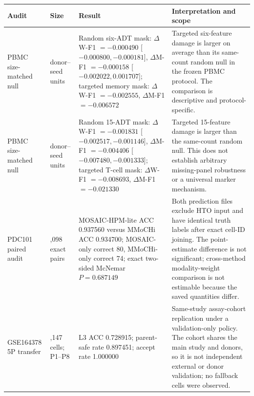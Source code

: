 \begin{tabularx}{\textwidth}{>{\raggedright\arraybackslash}p{2.7cm} >{\raggedright\arraybackslash}p{2.1cm} >{\raggedright\arraybackslash}p{4.2cm} X}
\toprule
Audit & Size & Result & Interpretation and scope \\
\midrule
PBMC size-matched null & 24 donor--seed units & Random six-ADT mask: $\Delta$W-F1 $=-0.000490$ [$-0.000800,-0.000181$], $\Delta$M-F1 $=-0.000158$ [$-0.002022,0.001707$]; targeted memory mask: $\Delta$W-F1 $=-0.002555$, $\Delta$M-F1 $=-0.006572$ & Targeted six-feature damage is larger on average than its same-count random null in the frozen PBMC protocol. The comparison is descriptive and protocol-specific. \\
PBMC size-matched null & 24 donor--seed units & Random 15-ADT mask: $\Delta$W-F1 $=-0.001831$ [$-0.002517,-0.001146$], $\Delta$M-F1 $=-0.004406$ [$-0.007480,-0.001333$]; targeted T-cell mask: $\Delta$W-F1 $=-0.008693$, $\Delta$M-F1 $=-0.021330$ & Targeted 15-feature damage is larger than the same-count random null. This does not establish arbitrary missing-panel robustness or a universal marker mechanism. \\
PDC101 paired audit & 2,098 exact pairs & MOSAIC-HPM-lite ACC 0.937560 versus MMoCHi ACC 0.934700; MOSAIC-only correct 80, MMoCHi-only correct 74; exact two-sided McNemar $P=0.687149$ & Both prediction files exclude HTO input and have identical truth labels after exact cell-ID joining. The point-estimate difference is not significant; cross-method modality-weight comparison is not estimable because the saved quantities differ. \\
GSE164378 5P transfer & 49,147 cells; P1--P8 & L3 ACC 0.728915; parent-safe rate 0.897451; accept rate 1.000000 & Same-study assay-cohort replication under a validation-only policy. The cohort shares the main study and donors, so it is not independent external or donor validation; no fallback cells were observed. \\
\bottomrule
\end{tabularx}
